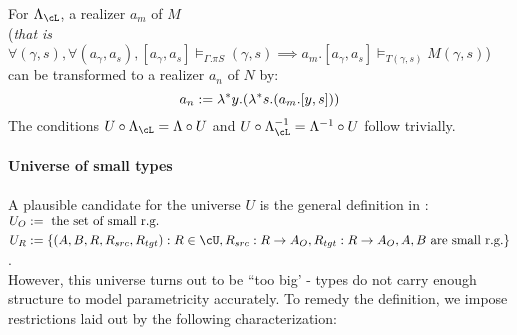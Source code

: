 \documentclass[12pt,a4paper]{article}
\def\src{_{src}}\alwaysmath{src}
\def\tgt{_{tgt}}\alwaysmath{tgt}
\renewcommand{\O}{_{O}}
\newcommand{\R}{\ensuremath{_{R}}}
\begin{document}
For $\Lambda_\cL$, a realizer $a_m$ of $M$\\
(\textit{that is } $\mathit{\forall (\gamma,s), \forall (a_\gamma, a_s), [a_\gamma, a_s] \vDash_{\Gamma. \pi S} (\gamma,s) \implies a_m. [a_\gamma, a_s] \vDash_{T(\gamma,s)} M(\gamma,s)}$)\\
can be transformed to a realizer $a_n$ of $N$ by:
$$a_n := \lambda^* y. (\lambda^* s . (a_m . [y, s]))$$ 
The conditions $U \comp \Lambda_\cL = \Lambda \comp U$ and $U \comp \Lambda^{-1}_\cL = \Lambda^{-1}\comp U$ follow trivially.

\paragraph*{Universe of small types}
A plausible candidate for the universe $U$ is the general definition in \cite{fill}:\\
$\begin{aligned}
  U\O &\define \text{ the set of small r.g. } \\
  U\R &\define \{(A, B, R, R\src, R\tgt) : R \in \cU, R\src: R \to A\O, R\tgt : R \to A\O, A,B \text{ are small r.g.}   \}
\end{aligned}$.\\

However, this universe turns out to be ``too big' - types do not carry enough structure to model parametricity accurately. To remedy the definition, we impose restrictions laid out by the following characterization:\\
\end{document}
